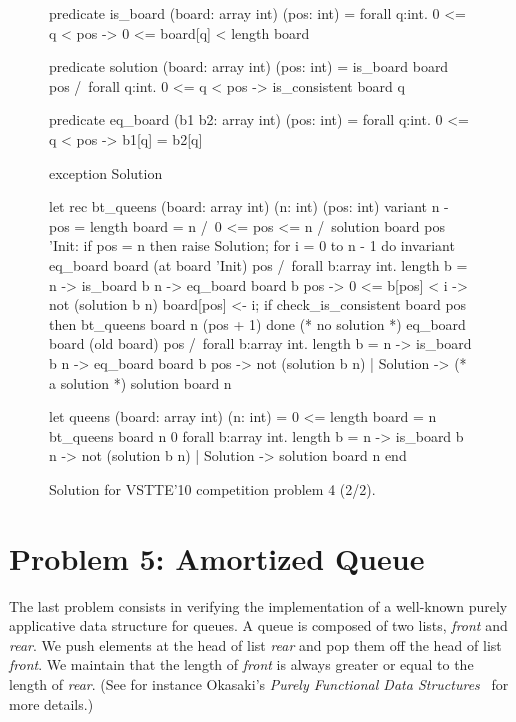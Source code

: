 \begin{figure}
  \centering
\begin{whycode}
  predicate is_board (board: array int) (pos: int) =
    forall q:int. 0 <= q < pos -> 0 <= board[q] < length board

  predicate solution (board: array int) (pos: int) =
    is_board board pos /\
    forall q:int. 0 <= q < pos -> is_consistent board q

  predicate eq_board (b1 b2: array int) (pos: int) =
    forall q:int. 0 <= q < pos -> b1[q] = b2[q]

  exception Solution

  let rec bt_queens (board: array int) (n: int) (pos: int)
                    variant { n - pos } =
    { length board = n /\ 0 <= pos <= n /\ solution board pos }
    'Init:
    if pos = n then raise Solution;
    for i = 0 to n - 1 do
      invariant {
        eq_board board (at board 'Init) pos /\
        forall b:array int. length b = n -> is_board b n ->
          eq_board board b pos -> 0 <= b[pos] < i -> not (solution b n) }
      board[pos] <- i;
      if check_is_consistent board pos then bt_queens board n (pos + 1)
    done
    { (* no solution *)
      eq_board board (old board) pos /\
      forall b:array int. length b = n -> is_board b n ->
        eq_board board b pos -> not (solution b n) }
    | Solution ->
    { (* a solution *)
      solution board n }

  let queens (board: array int) (n: int) =
    { 0 <= length board = n }
    bt_queens board n 0
    { forall b:array int. length b = n -> is_board b n ->
                            not (solution b n) }
    | Solution -> { solution board n }
end
\end{whycode}
\vspace*{-2em}\hrulefill
  \caption{Solution for VSTTE'10 competition problem 4 (2/2).}
  \label{fig:NQueens2}
\end{figure}


\section{Problem 5: Amortized Queue}

The last problem consists in verifying the implementation of a
well-known purely applicative data structure for queues.
A queue is composed of two lists, \textit{front} and \textit{rear}.
We push elements at the head of list \textit{rear} and pop them off
the head of list \textit{front}. We maintain that the length of
\textit{front} is always greater or equal to the length of \textit{rear}.
(See for instance Okasaki's \emph{Purely Functional Data
  Structures}~\cite{okasaki98} for more details.)

